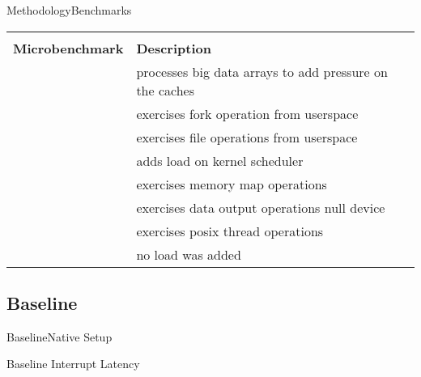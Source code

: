 \documentclass[10pt,hyperref={hyperfootnotes=false}, xcolor={usenames, dvipsnames}]{beamer}
\begin{document}
\begin{frame}{Methodology}{Benchmarks}
	\begin{table}[!htb]
	\centering
	\begin{tabular}{|r|p{6cm}|}  
	\hline
	& \\
	\textbf{Microbenchmark} & \textbf{Description} \\ \hline 
	\mcachepressure{} & processes big data arrays to add pressure on the caches\\ \hline
	\mforkops{} 	& exercises fork operation from userspace\\ \hline
	\mfileops{} 	& exercises file operations from userspace \\ \hline
	\mhackbench{} 	& adds load on kernel scheduler \\ \hline
	\mmmapops{} 	& exercises memory map operations \\ \hline
	\mstdout{} 		& exercises data output operations null device\\ \hline
	\mthreadops{} 	& exercises posix thread operations \\ \hline
	\mnoload{} 	& no load was added \\ \hline
	\end{tabular}
	\end{table}
\end{frame}

\subsection{Baseline}
\begin{frame}{Baseline}{Native Setup}
  	\begingroup
	
	\endgroup
\end{frame}

\begin{frame}{Baseline} {Interrupt Latency}
	
\end{frame}
\end{document}
